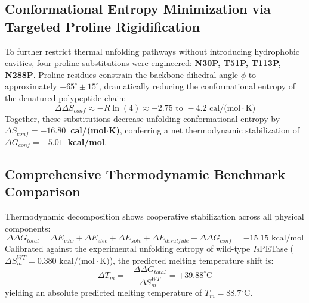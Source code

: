 \documentclass[journal=natcat,manuscript=article]{achemso}
\begin{document}
\subsection{Conformational Entropy Minimization via Targeted Proline Rigidification}
To further restrict thermal unfolding pathways without introducing hydrophobic cavities, four proline substitutions were engineered: \textbf{N30P, T51P, T113P, N288P}. Proline residues constrain the backbone dihedral angle $\phi$ to approximately $-65^\circ \pm 15^\circ$, dramatically reducing the conformational entropy of the denatured polypeptide chain:
\begin{equation}
\Delta\Delta S_{conf} \approx -R \ln(4) \approx -2.75\text{ to }-4.2\text{ cal/(mol}\cdot\text{K)}
\end{equation}
Together, these substitutions decrease unfolding conformational entropy by \textbf{$\Delta S_{conf} = -16.80$~cal/(mol$\cdot$K)}, conferring a net thermodynamic stabilization of \textbf{$\Delta G_{conf} = -5.01$~kcal/mol}.

\subsection{Comprehensive Thermodynamic Benchmark Comparison}
Thermodynamic decomposition shows cooperative stabilization across all physical components:
\begin{equation}
\Delta\Delta G_{total} = \Delta E_{vdw} + \Delta E_{elec} + \Delta E_{solv} + \Delta E_{disulfide} + \Delta\Delta G_{conf} = -15.15\text{ kcal/mol}
\end{equation}
Calibrated against the experimental unfolding entropy of wild-type \textit{Is}PETase ($\Delta S_m^{WT} = 0.380\text{ kcal/(mol}\cdot\text{K)}$), the predicted melting temperature shift is:
\begin{equation}
\Delta T_m = -\frac{\Delta\Delta G_{total}}{\Delta S_m^{WT}} = +39.88^\circ\text{C}
\end{equation}
yielding an absolute predicted melting temperature of \textbf{$T_m = 88.7^\circ\text{C}$}.
\end{document}
